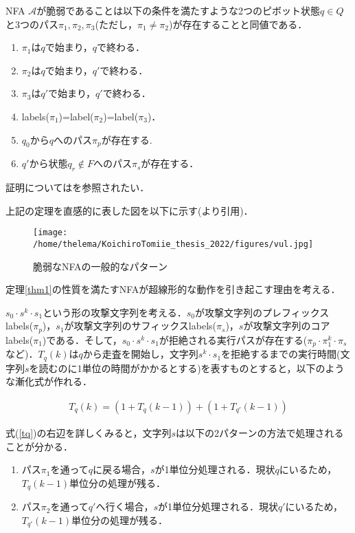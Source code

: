 \documentclass[a4paper, 12pt, dvipdfmx, uplatex]{jsreport}
\begin{document}
\begin{thm}\label{thm1}
  NFA $\mathcal{A}$が脆弱であることは以下の条件を満たすような2つのピボット状態$q\in Q$と3つのパス$\pi_1,\pi_2,\pi_3$(ただし，$\pi_1 \neq \pi_2$)が存在することと同値である．
    \begin{enumerate}
      \item $\pi_1$は$q$で始まり，$q$で終わる．
      \item $\pi_2$は$q$で始まり，$q'$で終わる．
      \item $\pi_3$は$q'$で始まり，$q'$で終わる．
      \item labels($\pi_1$)=label($\pi_2$)=label($\pi_3$)．
      \item $q_0$から$q$へのパス$\pi_p$が存在する.
      \item $q'$から状態$q_r \notin F$へのパス$\pi_s$が存在する．
    \end{enumerate}
\end{thm}
証明については\cite{vul_detect}を参照されたい．

上記の定理を直感的に表した図を以下に示す(\cite{vul_detect}より引用)．
\begin{figure}[H] %
  \centering
  \texttt{[image: /home/thelema/KoichiroTomiie\_thesis\_2022/figures/vul.jpg]}
  \caption{脆弱なNFAの一般的なパターン\label{vul_nfa}}
\end{figure}

定理\ref{thm1}の性質を満たすNFAが超線形的な動作を引き起こす理由を考える．

$s_0\cdot s^k\cdot s_1$という形の攻撃文字列を考える．$s_0$が攻撃文字列のプレフィックスlabels($\pi_p$)，$s_1$が攻撃文字列のサフィックスlabels($\pi_s$)，$s$が攻撃文字列のコアlabels($\pi_1$)である．そして，$s_0\cdot s^k\cdot s_1$が拒絶される実行パスが存在する($\pi_p \cdot \pi_1^k \cdot \pi_s$など)．$T_q(k)$は$q$から走査を開始し，文字列$s^k\cdot s_1$を拒絶するまでの実行時間(文字列$s$を読むのに1単位の時間がかかるとする)を表すものとすると，以下のような漸化式が作れる．

\begin{align}
  T_q(k)=(1+T_q(k-1))+(1+T_{q'}(k-1))\label{tq}
\end{align}

式(\ref{tq})の右辺を詳しくみると，文字列$s$は以下の2パターンの方法で処理されることが分かる．
\begin{enumerate}
  \item パス$\pi_1$を通って$q$に戻る場合，$s$が1単位分処理される．現状$q$にいるため，$T_q(k-1)$単位分の処理が残る．
  \item パス$\pi_2$を通って$q'$へ行く場合，$s$が1単位分処理される．現状$q'$にいるため，$T_{q'}(k-1)$単位分の処理が残る．
\end{enumerate}
\end{document}
